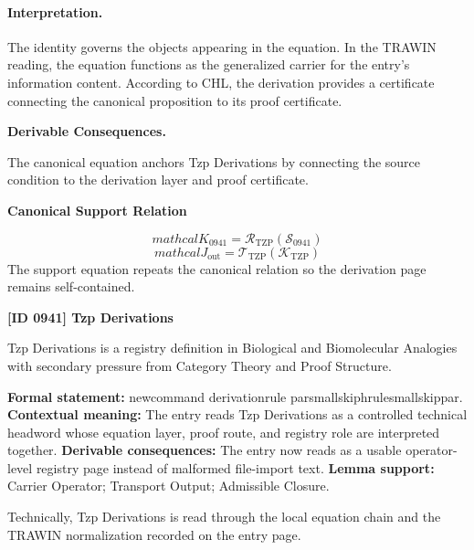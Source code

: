 \paragraph{Interpretation.}
The identity governs the objects appearing in the equation. In the TRAWIN reading, the equation functions as the generalized carrier for the entry’s information content. According to CHL, the derivation provides a certificate connecting the canonical proposition to its proof certificate.

\par\vspace{0.35em}
\noindent\textbf{Derivable Consequences.}\quad
\begingroup
\footnotesize
\raggedright
The canonical equation anchors Tzp Derivations by connecting the source condition to the derivation layer and proof certificate.
\par\endgroup

\noindent\textbf{Canonical Support Relation}\par
\[
mathcal{K}_{0941}=\mathcal{R}_{\mathrm{TZP}}\!\left(\mathcal{S}_{0941}\right)
\]
\[
mathcal{J}_{\mathrm{out}} = \mathcal{T}_{\mathrm{TZP}}\!\left(\mathcal{K}_{\mathrm{TZP}}\right)
\]
\noindent The support equation repeats the canonical relation so the derivation page remains self-contained.\par

\clearpage
\noindent\textbf{[ID 0941] Tzp Derivations}\par
\vspace{0.35em}
\begingroup\small
{}
Tzp Derivations is a registry definition in Biological and Biomolecular Analogies with secondary pressure from Category Theory and Proof Structure.

\begingroup\footnotesize\setlength{\emergencystretch}{3em}\sloppy
\textbf{Formal statement:} newcommand derivationrule parsmallskiphrulesmallskippar. \textbf{Contextual meaning:} The entry reads Tzp Derivations as a controlled technical headword whose equation layer, proof route, and registry role are interpreted together. \textbf{Derivable consequences:} The entry now reads as a usable operator-level registry page instead of malformed file-import text. \textbf{Lemma support:} Carrier Operator; Transport Output; Admissible Closure.\par
\endgroup

Technically, Tzp Derivations is read through the local equation chain and the TRAWIN normalization recorded on the entry page.

